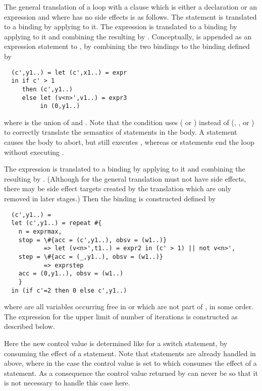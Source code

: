 The general translation of a loop  with a clause  which is either a declaration or an expression
and where  has no side effects
is as follows. The statement  is translated to a binding  by applying  to it. The expression
 is translated to a binding  by applying  to it and combining the resulting
 by . Conceptually,  is appended as an expression statement to , by combining
the two bindings to the binding  defined by
\begin{verbatim}
  (c',y1..) = let (c',x1..) = expr
  in if c' > 1
     then (c',y1..)
     else let (v<n>',v1..) = expr3
          in (0,y1..)
\end{verbatim}
where  is the union of  and . Note that the condition uses  ( or ) 
instead of  (, , or ) to correctly translate the semantics of  
statements in the body. A  statement causes the body to abort, but still executes , whereas  
or  statements end the loop without executing .

The expression  is translated to a binding  by applying  to it and combining 
the resulting  by . (Although for the general translation  must not have side effects, there
may be side effect targets  created by the translation which are only removed in later stages.)
Then the binding  is constructed defined by
\begin{verbatim}
  (c',y1..) =
  let (c',y1..) = repeat #{
    n = exprmax,
    stop = \#{acc = (c',y1..), obsv = (w1..)} 
           => let (v<n>',t1..) = expr2 in (c' > 1) || not v<n>',
    step = \#{acc = (_,y1..), obsv = (w1..)} 
           => exprstep
    acc = (0,y1..), obsv = (w1..)
    }
  in (if c'=2 then 0 else c',y1..)
\end{verbatim}
where  are all variables occurring free in  or  which are not part of , in some order.
The expression  for the upper limit of number of iterations is constructed as described below.

Here the new control value is determined like for a switch statement, by consuming the effect of a  statement. Note that
 statements are already handled in  above, where in the  case the control
value is set to  which consumes the effect of a  statement. As a consequence the control value returned by
 can never be  so that it is not necessary to handle this case here.


